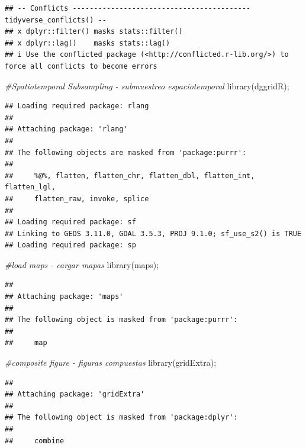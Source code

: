 \documentclass[
]{article}
\newenvironment{Shaded}{\begin{snugshade}}{\end{snugshade}}
\newcommand{\CommentTok}[1]{\textcolor[rgb]{0.56,0.35,0.01}{\textit{#1}}}
\newcommand{\FunctionTok}[1]{\textcolor[rgb]{0.00,0.00,0.00}{#1}}
\newcommand{\NormalTok}[1]{#1}
\begin{document}
\begin{verbatim}
## -- Conflicts ------------------------------------------ tidyverse_conflicts() --
## x dplyr::filter() masks stats::filter()
## x dplyr::lag()    masks stats::lag()
## i Use the conflicted package (<http://conflicted.r-lib.org/>) to force all conflicts to become errors
\end{verbatim}

\begin{Shaded}
\begin{Highlighting}[]
\CommentTok{\#Spatiotemporal Subsampling {-} submuestreo espaciotemporal}
\FunctionTok{library}\NormalTok{(dggridR); }
\end{Highlighting}
\end{Shaded}

\begin{verbatim}
## Loading required package: rlang
## 
## Attaching package: 'rlang'
## 
## The following objects are masked from 'package:purrr':
## 
##     %@%, flatten, flatten_chr, flatten_dbl, flatten_int, flatten_lgl,
##     flatten_raw, invoke, splice
## 
## Loading required package: sf
## Linking to GEOS 3.11.0, GDAL 3.5.3, PROJ 9.1.0; sf_use_s2() is TRUE
## Loading required package: sp
\end{verbatim}

\begin{Shaded}
\begin{Highlighting}[]
\CommentTok{\#load maps {-} cargar mapas}
\FunctionTok{library}\NormalTok{(maps); }
\end{Highlighting}
\end{Shaded}

\begin{verbatim}
## 
## Attaching package: 'maps'
## 
## The following object is masked from 'package:purrr':
## 
##     map
\end{verbatim}

\begin{Shaded}
\begin{Highlighting}[]
\CommentTok{\#composite figure {-} figuras compuestas}
\FunctionTok{library}\NormalTok{(gridExtra); }
\end{Highlighting}
\end{Shaded}

\begin{verbatim}
## 
## Attaching package: 'gridExtra'
## 
## The following object is masked from 'package:dplyr':
## 
##     combine
\end{verbatim}
\end{document}
